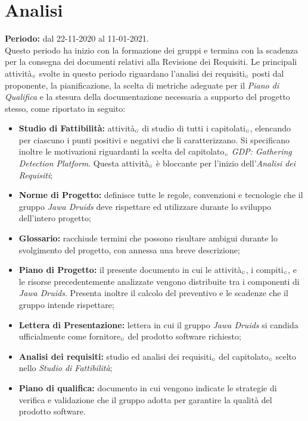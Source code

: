 \section{Analisi}\label{PianificazioneAnalisi}
\textbf{Periodo:} dal 22-11-2020 al 11-01-2021.\\
Questo periodo ha inizio con la formazione dei gruppi e termina con la scadenza per la consegna dei documenti relativi alla Revisione dei Requisiti.
Le principali attività$_{\scaleto{G}{3pt}}$ svolte in questo periodo riguardano l'analisi dei requisiti$_{\scaleto{G}{3pt}}$ posti dal proponente, la pianificazione, la scelta di metriche adeguate per il \textit{Piano di Qualifica} e la stesura della documentazione necessaria a supporto del progetto stesso, come riportato in seguito:
\begin{itemize}
	\item \textbf{Studio di Fattibilità:} attività$_{\scaleto{G}{3pt}}$ di studio di tutti i capitolati$_{\scaleto{G}{3pt}}$, elencando per ciascuno i punti positivi e negativi che li caratterizzano. Si specificano inoltre le motivazioni riguardanti la scelta del capitolato$_{\scaleto{G}{3pt}}$ \textit{GDP: Gathering Detection Platform}.
	Questa attività$_{\scaleto{G}{3pt}}$ è bloccante per l'inizio dell'\textit{Analisi dei Requisiti};
	\item \textbf{Norme di Progetto:} definisce tutte le regole, convenzioni e tecnologie che il gruppo \textit{Jawa Druids} deve rispettare ed utilizzare durante lo sviluppo dell'intero progetto;
	\item \textbf{Glossario:} racchiude termini che possono risultare ambigui durante lo svolgimento del progetto, con annessa una breve descrizione;
	\item \textbf{Piano di Progetto:} il presente documento in cui le attività$_{\scaleto{G}{3pt}}$, i compiti$_{\scaleto{G}{3pt}}$, e le risorse precedentemente analizzate vengono distribuite tra i componenti di \textit{Jawa Druids}. Presenta inoltre il calcolo del preventivo e le scadenze che il gruppo intende rispettare;
	\item \textbf{Lettera di Presentazione:} lettera in cui il gruppo \textit{Jawa Druids} si candida ufficialmente come fornitore$_{\scaleto{G}{3pt}}$ del prodotto software richiesto;
	\item \textbf{Analisi dei requisiti:} studio ed analisi dei requisiti$_{\scaleto{G}{3pt}}$ del capitolato$_{\scaleto{G}{3pt}}$ scelto nello \textit{Studio di Fattibilità};
	\item \textbf{Piano di qualifica:} documento in cui vengono indicate le strategie di verifica e validazione che il gruppo adotta per garantire la qualità del prodotto software.
\end{itemize}
